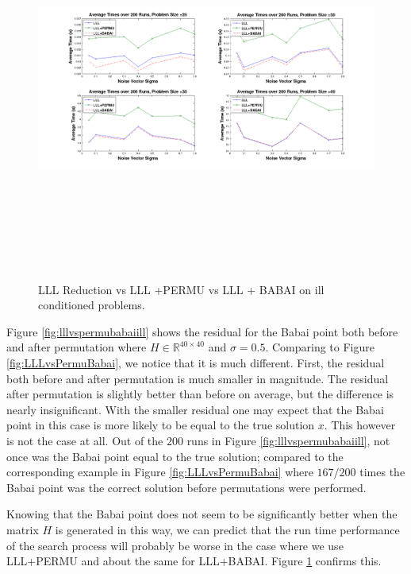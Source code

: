 \documentclass[12pt,Bold,letterpaper]{mcgilletdclass}
\begin{document}
\begin{figure}
\centering
\includegraphics[width=6.5in,height=5in]{lllvspermuvsbabaiill.png}
\caption{LLL Reduction vs LLL +PERMU vs LLL + BABAI on ill conditioned problems.}
\label{fig:lllvspermuvsbabaiill}
\end{figure}

Figure \ref{fig:lllvspermubabaiill} shows the residual for the Babai point both before and after permutation where $H \in \mathbb{R}^{40 \times 40}$ and $\sigma = 0.5$. Comparing to Figure \ref{fig:LLLvsPermuBabai}, we notice that it is much different. First, the residual both before and after permutation is much smaller in magnitude. The residual after permutation is slightly better than before on average, but the difference is nearly insignificant. With the smaller residual one may expect that the Babai point in this case is more likely to be equal to the true solution $x$. This however is not the case at all. Out of the $200$ runs in Figure \ref{fig:lllvspermubabaiill}, not once was the Babai point equal to the true solution; compared to the corresponding example in Figure \ref{fig:LLLvsPermuBabai} where $167/200$ times the Babai point was the correct solution before permutations were performed.

Knowing that the Babai point does not seem to be significantly better when the matrix $H$ is generated in this way, we can predict that the run time performance of the search process will probably be worse in the case where we use LLL+PERMU and about the same for LLL+BABAI. Figure \ref{fig:lllvspermuvsbabaiill} confirms this.
\end{document}
